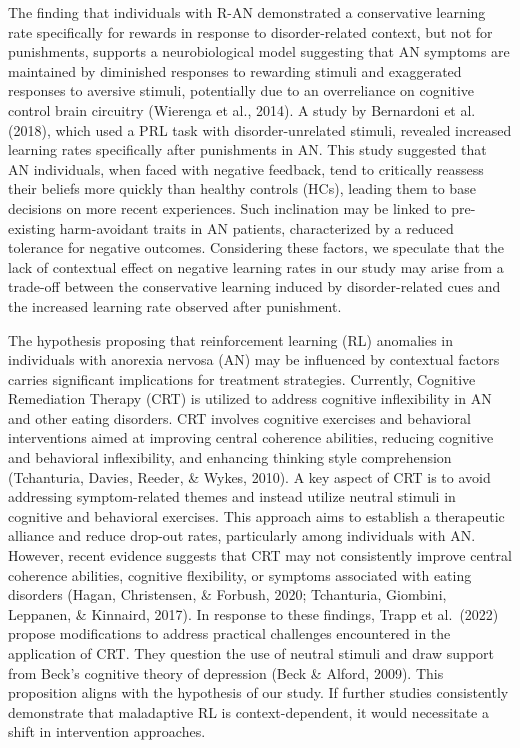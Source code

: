 \documentclass[
  man,floatsintext]{apa6}
\begin{document}
The finding that individuals with R-AN demonstrated a conservative learning rate specifically for rewards in response to disorder-related context, but not for punishments, supports a neurobiological model suggesting that AN symptoms are maintained by diminished responses to rewarding stimuli and exaggerated responses to aversive stimuli, potentially due to an overreliance on cognitive control brain circuitry (Wierenga et al., 2014). A study by Bernardoni et al. (2018), which used a PRL task with disorder-unrelated stimuli, revealed increased learning rates specifically after punishments in AN. This study suggested that AN individuals, when faced with negative feedback, tend to critically reassess their beliefs more quickly than healthy controls (HCs), leading them to base decisions on more recent experiences. Such inclination may be linked to pre-existing harm-avoidant traits in AN patients, characterized by a reduced tolerance for negative outcomes. Considering these factors, we speculate that the lack of contextual effect on negative learning rates in our study may arise from a trade-off between the conservative learning induced by disorder-related cues and the increased learning rate observed after punishment.

The hypothesis proposing that reinforcement learning (RL) anomalies in individuals with anorexia nervosa (AN) may be influenced by contextual factors carries significant implications for treatment strategies. Currently, Cognitive Remediation Therapy (CRT) is utilized to address cognitive inflexibility in AN and other eating disorders. CRT involves cognitive exercises and behavioral interventions aimed at improving central coherence abilities, reducing cognitive and behavioral inflexibility, and enhancing thinking style comprehension (Tchanturia, Davies, Reeder, \& Wykes, 2010). A key aspect of CRT is to avoid addressing symptom-related themes and instead utilize neutral stimuli in cognitive and behavioral exercises. This approach aims to establish a therapeutic alliance and reduce drop-out rates, particularly among individuals with AN. However, recent evidence suggests that CRT may not consistently improve central coherence abilities, cognitive flexibility, or symptoms associated with eating disorders (Hagan, Christensen, \& Forbush, 2020; Tchanturia, Giombini, Leppanen, \& Kinnaird, 2017). In response to these findings, Trapp et al.~(2022) propose modifications to address practical challenges encountered in the application of CRT. They question the use of neutral stimuli and draw support from Beck's cognitive theory of depression (Beck \& Alford, 2009). This proposition aligns with the hypothesis of our study. If further studies consistently demonstrate that maladaptive RL is context-dependent, it would necessitate a shift in intervention approaches.
\end{document}

